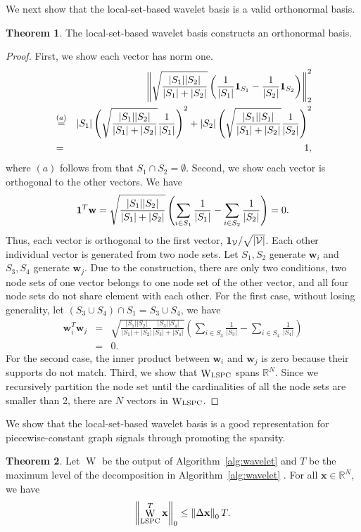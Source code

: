 \documentclass[journal,twocolumn,10pt]{IEEEtran}
\theoremstyle{definition}
\newtheorem{myThm}{Theorem}
\newcommand{\R}{\ensuremath{\mathbb{R}}}
\def\x{\mathbf{x}}
\def\w{\mathbf{w}}
\def\V{\mathcal{V}}
\DeclareMathOperator{\W}{W}
\begin{document}
We next show that the local-set-based wavelet basis is a valid orthonormal basis.
\begin{myThm}
The local-set-based wavelet basis constructs an orthonormal basis.
\end{myThm}
\begin{proof}
First, we show each vector has norm one.
\begin{eqnarray*}
&& \left\| \sqrt{ \frac{|S_1| |S_2|}{|S_1|+|S_2|}} \left(  \frac{1}{ | S_1 |} {\bf 1}_{S_1} - \frac{1}{| S_2 |} {\bf 1}_{S_2}\right)  \right\|_2^2 
\\
&  \stackrel{(a)}{=} & 
|S_1|  \left( \sqrt{\frac{|S_1| |S_2|}{|S_1|+|S_2|}}  \frac{1}{ | S_1 |}  \right)^2 +  |S_2|  \left( \sqrt{\frac{|S_1| |S_1|}{|S_1|+|S_2|}}  \frac{1}{ | S_2 |}  \right)^2 
\\
& = & 1,
\end{eqnarray*}
where $(a)$ follows from that $S_1 \cap S_2 = \emptyset$.
Second, we show each vector is orthogonal to the other vectors. We have
\begin{eqnarray*}
{\bf 1}^T \w = \sqrt{ \frac{|S_1| |S_2|}{|S_1|+|S_2|}} \left( \sum_{i \in S_1} \frac{1}{ | S_1 |}  -  \sum_{i \in S_2} \frac{1}{| S_2 |}  \right) = 0.
\end{eqnarray*}
Thus, each vector is orthogonal to the first vector, ${\bf 1}_{\V}/\sqrt{|{\V}| }$. Each other individual vector is generated from two node sets. Let $S_1, S_2$ generate $\w_i$ and $S_3, S_4$ generate $\w_j$. Due to the construction, there are only two conditions, two node sets of one vector belongs to one node set of the other vector, and all four node sets do not share element with each other. For the first case, without losing generality, let $\left( S_3 \cup S_4 \right) \cap S_1=  S_3 \cup S_4$, we have
\begin{eqnarray*}
 \w_i^T \w_j 
& = &  \sqrt{ \frac{|S_1| |S_2|}{|S_1|+|S_2|}
 \frac{|S_3| |S_4|}{|S_3|+|S_4|}} \left( \sum_{i \in S_3} \frac{1}{ | S_3 |}  -  \sum_{i \in S_4} \frac{1}{| S_4 |} \right) 
\\ 
& = & 0.
\end{eqnarray*}
For the second case, the inner product between  $\w_i$ and $\w_j $ is zero because their supports do not match.
Third, we show that $\W_{\rm LSPC}$ spans $\R^N$. Since we recursively partition the node set until the cardinalities of all the node sets are smaller than 2, there are $N$ vectors in $\W_{\rm LSPC}$.
\end{proof}

We show that the local-set-based wavelet basis is a good representation for piecewise-constant graph signals through promoting the sparsity.
\begin{myThm}
\label{thm:sparse}
Let $\W$ be the output of Algorithm~\ref{alg:wavelet} and $T$ be the maximum level of the decomposition in Algorithm~\ref{alg:wavelet} . For all $\x \in \R^N$, we have
\begin{eqnarray*}
\left\| \W_{\rm LSPC}^T \x \right\|_0 \leq  \left\|  \Delta \x \right\|_0  T.
\end{eqnarray*}
\end{myThm}
\end{document}
